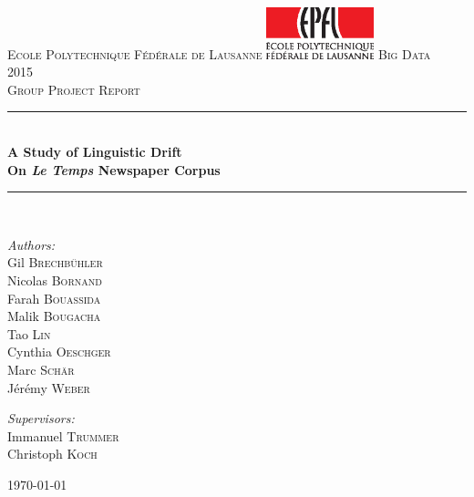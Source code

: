 \documentclass[a4paper,11pt] {article}
\newcommand{\HRule}{\rule{\linewidth}{0.5mm}}
\begin{document}
\begin{titlepage}
\begin{center}
\textsc{\LARGE Ecole Polytechnique Fédérale de Lausanne}
\vskip 0.5cm
\includegraphics[height=1.5cm]{Pictures/EPFL-Logo-CMJN.eps}
\vskip 0.5cm
\textsc{\Large Big Data\\
 2015}\\[1.5cm]

\textsc{\Large Group Project Report}\\[3cm]

\HRule \\[0.4cm]
{ \huge \bfseries A Study of Linguistic Drift\\[0.5cm] }
{ \huge \bfseries On \emph{Le Temps} Newspaper Corpus\\[0.4cm] }

\HRule \\[3.5cm]

\begin{minipage}{0.5\textwidth}
\begin{flushleft} \large
\textit{Authors:}\\
Gil \textsc{Brechbühler}\\
Nicolas \textsc{Bornand}\\
Farah \textsc{Bouassida}\\
Malik \textsc{Bougacha}\\
Tao \textsc{Lin}\\
Cynthia \textsc{Oeschger}\\
Marc \textsc{Schär}\\
Jérémy \textsc{Weber}\\
\end{flushleft}
\end{minipage}
\begin{minipage}{0.4\textwidth}
\begin{flushright} \large
\textit{Supervisors:} \\
Immanuel \textsc{Trummer}\\
Christoph \textsc{Koch}\\
\end{flushright}
\end{minipage}

\vfill

{\large \today}

\end{center}
\end{titlepage}
\end{document}
